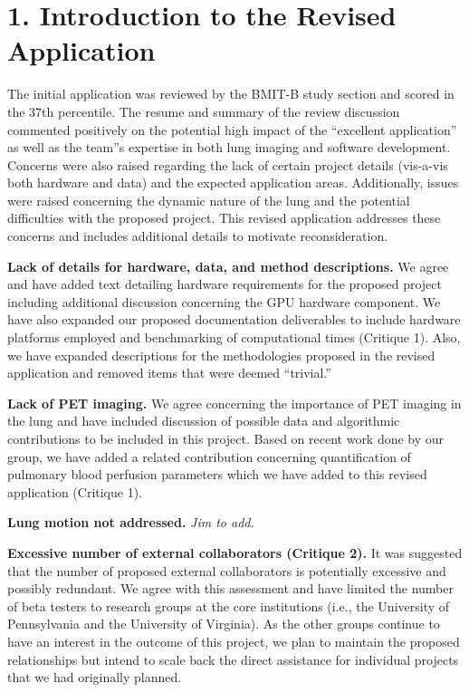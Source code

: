 \documentclass[11pt,]{article}
\title{}
\author{}
\date{}
\begin{document}
\maketitle


\section{1. Introduction to the Revised
Application}\label{introduction-to-the-revised-application}

The initial application was reviewed by the BMIT-B study section and
scored in the 37th percentile. The resume and summary of the review
discussion commented positively on the potential high impact of the
``excellent application'' as well as the team''s expertise in both lung
imaging and software development. Concerns were also raised regarding
the lack of certain project details (vis-a-vis both hardware and data)
and the expected application areas. Additionally, issues were raised
concerning the dynamic nature of the lung and the potential difficulties
with the proposed project. This revised application addresses these
concerns and includes additional details to motivate reconsideration.

\textbf{Lack of details for hardware, data, and method descriptions.} We
agree and have added text detailing hardware requirements for the
proposed project including additional discussion concerning the GPU
hardware component. We have also expanded our proposed documentation
deliverables to include hardware platforms employed and benchmarking of
computational times (Critique 1). Also, we have expanded descriptions
for the methodologies proposed in the revised application and removed
items that were deemed ``trivial.''

\textbf{Lack of PET imaging.} We agree concerning the importance of PET
imaging in the lung and have included discussion of possible data and
algorithmic contributions to be included in this project. Based on
recent work done by our group, we have added a related contribution
concerning quantification of pulmonary blood perfusion parameters which
we have added to this revised application (Critique 1).

\textbf{Lung motion not addressed.} \emph{Jim to add.}

\textbf{Excessive number of external collaborators (Critique 2).} It was
suggested that the number of proposed external collaborators is
potentially excessive and possibly redundant. We agree with this
assessment and have limited the number of beta testers to research
groups at the core institutions (i.e., the University of Pennsylvania
and the University of Virginia). As the other groups continue to have an
interest in the outcome of this project, we plan to maintain the
proposed relationships but intend to scale back the direct assistance
for individual projects that we had originally planned.
\end{document}
